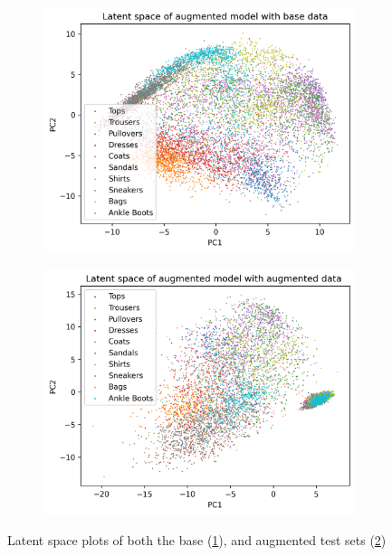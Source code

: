 \documentclass[twocolumn]{article}
\begin{document}
\begin{figure}[h!]
    \begin{subfigure}[t]{0.45\columnwidth}
        \centering
        \includegraphics[width=\columnwidth]{../images/cvae-aug.png}
        \caption{}
        \label{fig:base-latent}
    \end{subfigure} 
    \hfill
    \begin{subfigure}[t]{0.45\columnwidth}
        \centering
        \includegraphics[width=\columnwidth]{../images/cvae-aug2.png}
        \caption{}
        \label{fig:aug-latent}
    \end{subfigure} 
    \caption{Latent space plots of both the base (\ref{fig:base-latent}), and augmented test sets (\ref{fig:aug-latent})}
    \label{fig:latent-space-plot}
\end{figure}
\end{document}
